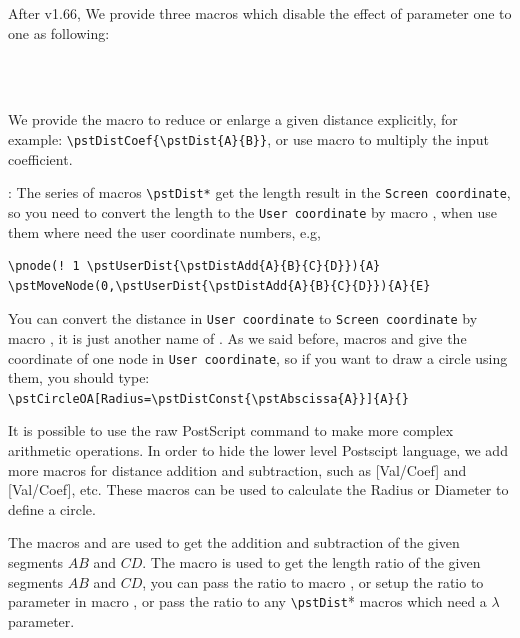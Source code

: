 \documentclass[11pt,english,BCOR=10mm,DIV=12,bibliography=totoc,parskip=false,headings=small,
    headinclude=false,footinclude=false,twoside,english]{pst-doc}
\begin{document}
After v1.66, We provide three macros which disable the effect of parameter 
one to one as following:

\begin{BDef}
\\
\\
\end{BDef}

We provide the macro  to reduce or enlarge a given distance explicitly,
for example: \verb|\pstDistCoef{\pstDist{A}{B}}|, or use macro  to multiply
the input coefficient.

\vspace{10pt}:
The series of macros \verb|\pstDist*| get the length result in the \texttt{Screen coordinate},
so you need to convert the length to the \texttt{User coordinate} by macro ,
when use them where need the user coordinate numbers, e.g,

\begin{lstlisting}
\pnode(! 1 \pstUserDist{\pstDistAdd{A}{B}{C}{D}}){A}
\pstMoveNode(0,\pstUserDist{\pstDistAdd{A}{B}{C}{D}}){A}{E}
\end{lstlisting}

You can convert the distance in \texttt{User coordinate} to \texttt{Screen coordinate} by
macro , it is just another name of . As we said before,
macros  and  give the coordinate of one node in
\texttt{User coordinate}, so if you want to draw a circle using them, you should type:\\[8pt]
\verb|\pstCircleOA[Radius=\pstDistConst{\pstAbscissa{A}}]{A}{}|

\vspace{10pt}

It is possible to use the raw PostScript command to make more complex arithmetic operations.
In order to hide the lower level Postscipt language, we add more macros for distance
addition and subtraction, such as [Val/Coef] and [Val/Coef], etc.
These macros can be used to calculate the Radius or Diameter to define a circle.

The macros  and  are used to get the addition and subtraction
of the given segments $AB$ and $CD$. The macro  is used to
get the length ratio of the given segments $AB$ and $CD$, you can pass the ratio to
macro , or setup the ratio to parameter  in
macro , or pass the ratio to any \verb|\pstDist|* macros which need
a $\lambda$ parameter.
\end{document}
